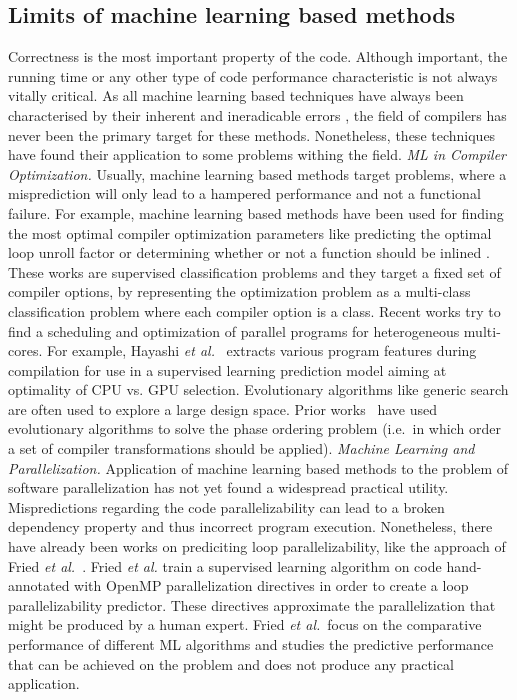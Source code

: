 \subsection{Limits of machine learning based methods}
\label{backgrnd_challenges_ml}
\quad Correctness is the most important property of the code. Although important, the running time or any other type of code performance characteristic is not always vitally critical. As all machine learning based techniques have always been characterised by their inherent and ineradicable errors \cite{James:2013:ISL:2517747}, the field of compilers has never been the primary target for these methods. Nonetheless, these techniques have found their application to some problems withing the field.\newline\null
\textit{ML in Compiler Optimization.}
Usually, machine learning based methods target problems, where a misprediction will only lead to a hampered performance and not a functional failure. For example, machine learning based methods have been used for finding the most optimal compiler optimization parameters like predicting the optimal loop unroll factor \cite{4907653,1402082} or determining whether or not a function should be inlined \cite{Zhao2003ToIO,1559966}. These works are supervised classification problems and they target a fixed set of compiler options, by representing the optimization problem as a multi-class classification problem where each compiler option is a class. Recent works try to find a scheduling and optimization of parallel programs for heterogeneous multi-cores. For example, Hayashi \emph{et al.}~\cite{Hayashi:2015:MPH:2807426.2807429} extracts various program features during compilation for use in a supervised learning prediction model aiming at optimality of CPU vs. GPU selection. Evolutionary algorithms like generic search are often used to explore a large design space. Prior works~\cite{Almagor:2004:FEC:997163.997196,Cooper:2005:AAC:1065910.1065921,Ashouri:2017:MMC:3132652.3124452} have used evolutionary algorithms to solve the phase ordering problem (i.e.\ in which order a set of compiler transformations should be applied).\newline\null
\textit{Machine Learning and Parallelization.}
Application of machine learning based methods to the problem of software parallelization has not yet found a widespread practical utility. Mispredictions regarding the code parallelizability can lead to a broken dependency property and thus incorrect program execution. Nonetheless, there have already been works on prediciting loop parallelizability, like the approach of Fried \emph{et al.}~\cite{fried_ea:2013:icmla}. Fried \emph{et al.} train a supervised learning algorithm on code hand-annotated with OpenMP parallelization directives in order to create a loop parallelizability predictor. These directives approximate the parallelization that might be produced by a human expert. Fried \emph{et al.}~focus on the comparative performance of different ML algorithms and studies the predictive performance that can be achieved on the problem and does not produce any practical application.\newline\null
